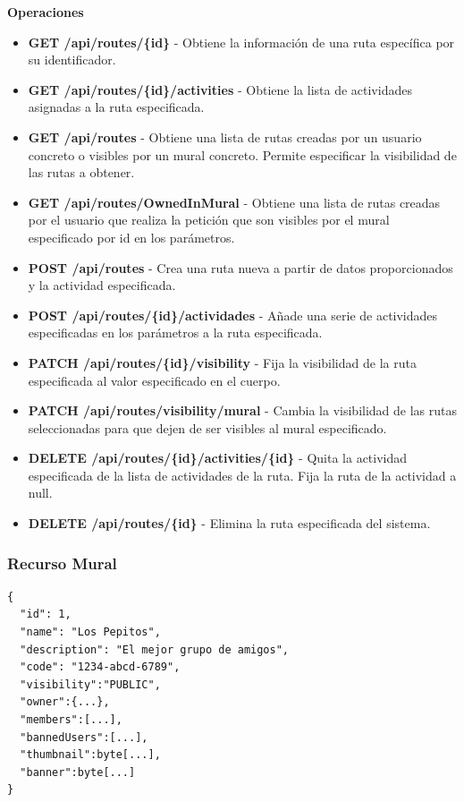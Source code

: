 \textbf{Operaciones}
\begin{itemize}
    \item \textbf{GET /api/routes/\{id\}} - Obtiene la información de una ruta específica por su identificador.
    \item \textbf{GET /api/routes/\{id\}/activities} - Obtiene la lista de actividades asignadas a la ruta especificada.
    \item \textbf{GET /api/routes} - Obtiene una lista de rutas creadas por un usuario concreto o visibles por un mural concreto. Permite especificar la visibilidad de las rutas a obtener.
    \item \textbf{GET /api/routes/OwnedInMural} - Obtiene una lista de rutas creadas por el usuario que realiza la petición que son visibles por el mural especificado por id en los parámetros.
    \item \textbf{POST /api/routes} - Crea una ruta nueva a partir de datos proporcionados y la actividad especificada.
    \item \textbf{POST /api/routes/\{id\}/actividades} - Añade una serie de actividades especificadas en los parámetros a la ruta especificada.
    
    \item \textbf{PATCH /api/routes/\{id\}/visibility} - Fija la visibilidad de la ruta especificada al valor especificado en el cuerpo.
    \item \textbf{PATCH /api/routes/visibility/mural} - Cambia la visibilidad de las rutas seleccionadas para que dejen de ser visibles al mural especificado.
    \item \textbf{DELETE /api/routes/\{id\}/activities/\{id\}} - Quita la actividad especificada de la lista de actividades de la ruta. Fija la ruta de la actividad a null.
    \item \textbf{DELETE /api/routes/\{id\}} - Elimina la ruta especificada del sistema.
\end{itemize}



\subsubsection{Recurso Mural}
\begin{lstlisting}[basicstyle=\jsonbasicfont,frame=single,backgroundcolor=\color{white},rulecolor=\color{black},framerule=0.5pt,numbers=none]
{
  "id": 1,
  "name": "Los Pepitos",
  "description": "El mejor grupo de amigos",
  "code": "1234-abcd-6789",
  "visibility":"PUBLIC",
  "owner":{...},
  "members":[...],
  "bannedUsers":[...],
  "thumbnail":byte[...],
  "banner":byte[...]
}
\end{lstlisting}

